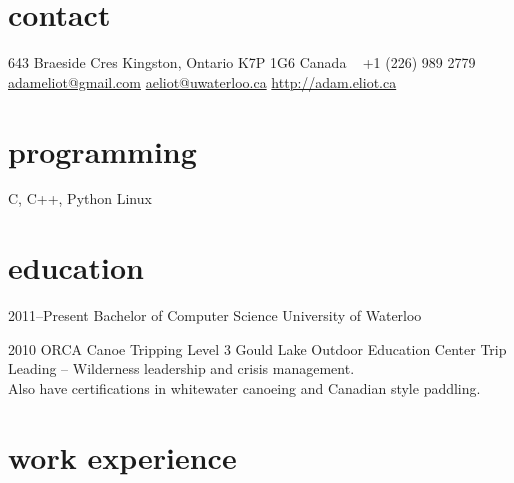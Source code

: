 \documentclass[]{eliot-cv} %
\begin{document}


\begin{aside} %
\section{contact}
643 Braeside Cres
Kingston, Ontario 
K7P 1G6
Canada
~
+1 (226) 989 2779
~
\href{mailto:adameliot@gmail.com}{adameliot@gmail.com}
\href{mailto:aeliot@uwaterloo.ca}{aeliot@uwaterloo.ca}
\href{http://adam.eliot.ca}{http://adam.eliot.ca}
\section{programming}
C, C++, Python
Linux
\end{aside}


\section{education}

\begin{entrylist}
\entry
{2011--Present}
{Bachelor {\normalfont of Computer Science}}
{University of Waterloo}
{}

\entry
{2010}
{ORCA {\normalfont Canoe Tripping Level 3}}
{Gould Lake Outdoor Education Center}
{Trip Leading -- Wilderness leadership and crisis management. \\
Also have certifications in whitewater canoeing and Canadian style paddling.}

\end{entrylist}


\section{work experience}
\end{document}
